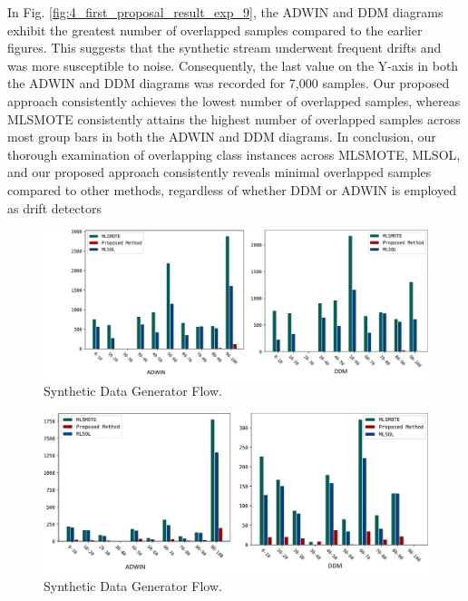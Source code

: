In Fig. \ref{fig:4_first_proposal_result_exp_9}, the ADWIN and DDM diagrams exhibit the greatest number of overlapped samples compared to the earlier figures. This suggests that the synthetic stream underwent frequent drifts and was more susceptible to noise. Consequently, the last value on the Y-axis in both the ADWIN and DDM diagrams was recorded for 7,000 samples. Our proposed approach consistently achieves the lowest number of overlapped samples, whereas MLSMOTE consistently attains the highest number of overlapped samples across most group bars in both the ADWIN and DDM diagrams. In conclusion, our thorough examination of overlapping class instances across MLSMOTE, MLSOL, and our proposed approach consistently reveals minimal overlapped samples compared to other methods, regardless of whether DDM or ADWIN is employed as drift detectors

\begin{figure}[!ht]
	\centering
	\includegraphics[width=1\linewidth]{4_Imbalanced/figures/exp_7.png}
	\caption{Synthetic Data Generator Flow.}
	\label{fig:4_first_proposal_result_exp_7}
\end{figure}

\begin{figure}[!ht]
	\centering
	\includegraphics[width=1\linewidth]{4_Imbalanced/figures/exp_8.png}
	\caption{Synthetic Data Generator Flow.}
	\label{fig:4_first_proposal_result_exp_8}
\end{figure}

